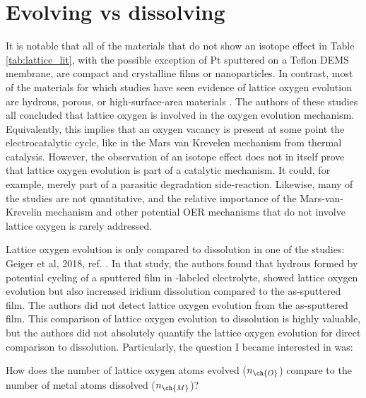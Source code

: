 
\section{Evolving vs dissolving}\label{sec:dissolving}

It is notable that all of the materials that do not show an isotope effect in Table \ref{tab:lattice_lit}, with the possible exception of Pt sputtered on a Teflon DEMS membrane\cite{Willsau1985}, are compact and crystalline films or nanoparticles\cite{Stoerzinger2017, Roy2018, Geiger2018}. In contrast, most of the materials for which studies have seen evidence of lattice oxygen evolution are hydrous, porous, or high-surface-area materials \cite{Wohlfahrt-Mehrens1987, Fierro2007, Surendranath2010, Amin2017, Grimaud2017, Geiger2018}. The authors of these studies all concluded that lattice oxygen is involved in the oxygen evolution mechanism. Equivalently, this implies that an oxygen vacancy is present at some point the electrocatalytic cycle, like in the Mars van Krevelen mechanism from thermal catalysis. However, the observation of an isotope effect does not in itself prove that lattice oxygen evolution is part of a catalytic mechanism. It could, for example, merely part of a parasitic degradation side-reaction. Likewise, many of the studies are not quantitative, and the relative importance of the Mars-van-Krevelin mechanism and other potential OER mechanisms that do not involve lattice oxygen is rarely addressed. 

Lattice oxygen evolution is only compared to dissolution in one of the studies: Geiger et al, 2018, ref. \cite{Geiger2018}. In that study, the authors found that hydrous  formed by potential cycling of a sputtered  film in -labeled electrolyte, showed lattice oxygen evolution but also increased iridium dissolution compared to the as-sputtered  film. The authors did not detect lattice oxygen evolution from the as-sputtered film. This comparison of lattice oxygen evolution to dissolution is highly valuable, but the authors did not absolutely quantify the lattice oxygen evolution for direct comparison to dissolution. Particularly, the question I became interested in was: 

\begin{question}
How does the number of lattice oxygen atoms evolved ($n_{\ch{O}}$) compare to the number of metal atoms dissolved ($n_{\ch{M}}$)?\label{q:O_vs_M}
\end{question}

